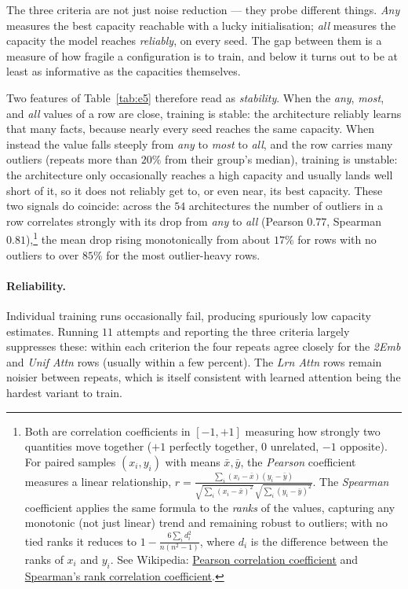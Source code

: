 \documentclass[11pt,a4paper]{article}
\begin{document}
The three criteria are not just noise reduction --- they probe different things. \emph{Any} measures the best capacity reachable with a lucky initialisation; \emph{all} measures the capacity the model reaches \emph{reliably}, on every seed. The gap between them is a measure of how fragile a configuration is to train, and below it turns out to be at least as informative as the capacities themselves.

Two features of Table~\ref{tab:e5} therefore read as \emph{stability}. When the \emph{any}, \emph{most}, and \emph{all} values of a row are close, training is stable: the architecture reliably learns that many facts, because nearly every seed reaches the same capacity. When instead the value falls steeply from \emph{any} to \emph{most} to \emph{all}, and the row carries many  outliers (repeats more than $20\%$ from their group's median), training is unstable: the architecture only occasionally reaches a high capacity and usually lands well short of it, so it does not reliably get to, or even near, its best capacity. These two signals do coincide: across the $54$ architectures the number of outliers in a row correlates strongly with its drop from \emph{any} to \emph{all} (Pearson $0.77$, Spearman $0.81$),\footnote{Both are correlation coefficients in $[-1,+1]$ measuring how strongly two quantities move together ($+1$ perfectly together, $0$ unrelated, $-1$ opposite). For paired samples $(x_i,y_i)$ with means $\bar x,\bar y$, the \emph{Pearson} coefficient measures a linear relationship, $r=\frac{\sum_i (x_i-\bar x)(y_i-\bar y)}{\sqrt{\sum_i (x_i-\bar x)^2}\,\sqrt{\sum_i (y_i-\bar y)^2}}$. The \emph{Spearman} coefficient applies the same formula to the \emph{ranks} of the values, capturing any monotonic (not just linear) trend and remaining robust to outliers; with no tied ranks it reduces to $1-\frac{6\sum_i d_i^2}{n(n^2-1)}$, where $d_i$ is the difference between the ranks of $x_i$ and $y_i$. See Wikipedia: \href{https://en.wikipedia.org/wiki/Pearson_correlation_coefficient}{Pearson correlation coefficient} and \href{https://en.wikipedia.org/wiki/Spearman\%27s_rank_correlation_coefficient}{Spearman's rank correlation coefficient}.} the mean drop rising monotonically from about $17\%$ for rows with no outliers to over $85\%$ for the most outlier-heavy rows.

\paragraph{Reliability.}
Individual training runs occasionally fail, producing spuriously low capacity estimates. Running $11$ attempts and reporting the three criteria largely suppresses these: within each criterion the four repeats agree closely for the \emph{2Emb} and \emph{Unif Attn} rows (usually within a few percent). The \emph{Lrn Attn} rows remain noisier between repeats, which is itself consistent with learned attention being the hardest variant to train.
\end{document}
